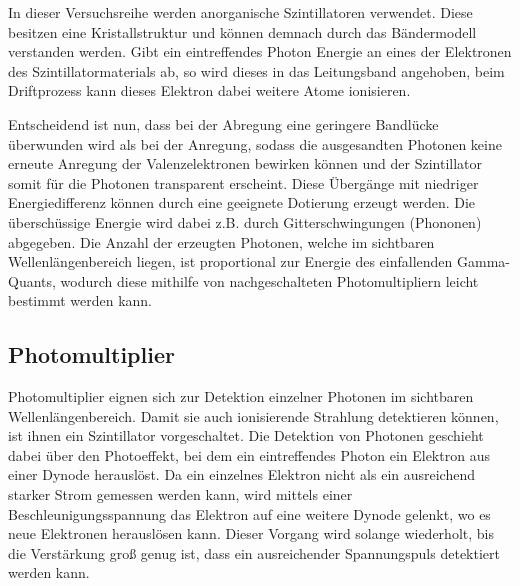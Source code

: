 In dieser Versuchsreihe werden anorganische Szintillatoren verwendet. Diese besitzen eine Kristallstruktur und können demnach durch das Bändermodell verstanden werden. Gibt ein eintreffendes Photon Energie an eines der Elektronen des Szintillatormaterials ab, so wird dieses in das Leitungsband angehoben, beim Driftprozess kann dieses Elektron dabei weitere Atome ionisieren. 

Entscheidend ist nun, dass bei der Abregung eine geringere Bandlücke überwunden wird als bei der Anregung, sodass die ausgesandten Photonen keine erneute Anregung der Valenzelektronen bewirken können und der Szintillator somit für die Photonen transparent erscheint. Diese Übergänge mit niedriger Energiedifferenz können durch eine geeignete Dotierung erzeugt werden. Die überschüssige Energie wird dabei z.B. durch Gitterschwingungen (Phononen) abgegeben. Die Anzahl der erzeugten Photonen, welche im sichtbaren Wellenlängenbereich liegen, ist proportional zur Energie des einfallenden Gamma-Quants, wodurch diese mithilfe von nachgeschalteten Photomultipliern leicht bestimmt werden kann.


\subsection{Photomultiplier}

Photomultiplier eignen sich zur Detektion einzelner Photonen im sichtbaren Wellenlängenbereich. Damit sie auch ionisierende Strahlung detektieren können, ist ihnen ein Szintillator vorgeschaltet. Die Detektion von Photonen geschieht dabei über den Photoeffekt, bei dem ein eintreffendes Photon ein Elektron aus einer Dynode herauslöst. Da ein einzelnes Elektron nicht als ein ausreichend starker Strom gemessen werden kann, wird mittels einer Beschleunigungsspannung das Elektron auf eine weitere Dynode gelenkt, wo es neue Elektronen herauslösen kann. Dieser Vorgang wird solange wiederholt, bis die Verstärkung groß genug ist, dass ein ausreichender Spannungspuls detektiert werden kann.